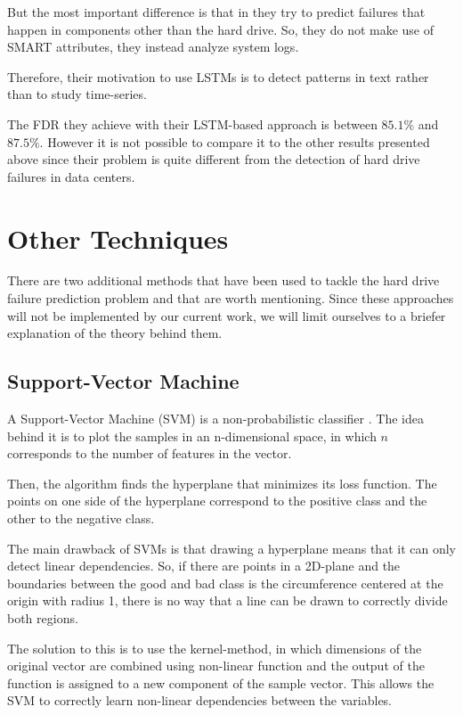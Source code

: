 But the most important difference is that in \cite{das2018desh} they try to predict failures that happen in components other than the hard drive.
So, they do not make use of SMART attributes, they instead analyze system logs.

Therefore, their motivation to use LSTMs is to detect patterns in text rather than to study time-series.

The FDR they achieve with their LSTM-based approach is between $85.1\%$ and $87.5\%$.
However it is not possible to compare it to the other results presented above since their problem is quite different from the detection of hard drive failures in data centers.

\section{Other Techniques}

There are two additional methods that have been used to tackle the hard drive failure prediction problem and that are worth mentioning.
Since these approaches will not be implemented by our current work, we will limit ourselves to a briefer explanation of the theory behind them.

\subsection{Support-Vector Machine}

A Support-Vector Machine (SVM) is a non-probabilistic classifier \cite{cortes1995support}.
The idea behind it is to plot the samples in an n-dimensional space, in which $n$ corresponds to the number of features in the vector.

Then, the algorithm finds the hyperplane that minimizes its loss function.
The points on one side of the hyperplane correspond to the positive class and the other to the negative class.

The main drawback of SVMs is that drawing a hyperplane means that it can only detect linear dependencies.
So, if there are points in a 2D-plane and the boundaries between the good and bad class is the circumference centered at the origin with radius 1, there is no way that a line can be drawn to correctly divide both regions.

The solution to this is to use the kernel-method, in which dimensions of the original vector are combined using non-linear function and the output of the function is assigned to a new component of the sample vector.
This allows the SVM to correctly learn non-linear dependencies between the variables.

